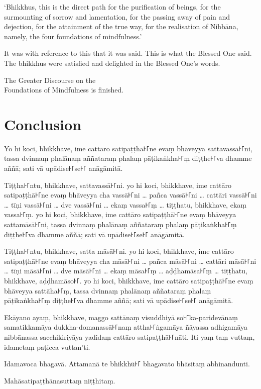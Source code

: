`Bhikkhus, this is the direct path for the purification of beings, for the
surmounting of sorrow and lamentation, for the passing away of pain and
dejection, for the attainment of the true way, for the realisation of Nibbāna,
namely, the four foundations of mindfulness.'

It was with reference to this that it was said. This is what the Blessed One
said. The bhikkhus were satisfied and delighted in the Blessed One's words.

\bigskip

{\centering\instructionFont\color{instruction}\upshape

  The Greater Discourse on the\\
  Foundations of Mindfulness is finished.

}

\paliPage
\chapter*{Conclusion}

Yo hi koci, bhikkhave, ime cattāro satipaṭṭhā꜔꜒ne evaṃ bhāveyya sattavassā꜔꜒ni,
tassa dvinnaṃ phalānaṃ aññataraṃ phalaṃ pāṭikaṅkha꜔꜒ṃ diṭṭhe꜔꜒va dhamme aññā; sati
vā upādise꜔꜒se꜔꜒ anāgāmitā.

Tiṭṭha꜔꜒ntu, bhikkhave, sattavassā꜔꜒ni. yo hi koci, bhikkhave, ime cattāro
satipaṭṭhā꜔꜒ne evaṃ bhāveyya cha vassā꜔꜒ni \ldots{} pañca vassā꜔꜒ni
\ldots{} cattāri vassā꜔꜒ni \ldots{} tīṇi vassā꜔꜒ni \ldots{} dve vassā꜔꜒ni \ldots{}
ekaṃ vassa꜔꜒ṃ \ldots{} tiṭṭhatu, bhikkhave, ekaṃ vassa꜔꜒ṃ. yo hi koci, bhikkhave,
ime cattāro satipaṭṭhā꜔꜒ne evaṃ bhāveyya sattamāsā꜔꜒ni, tassa dvinnaṃ phalānaṃ
aññataraṃ phalaṃ pāṭikaṅkha꜔꜒ṃ diṭṭhe꜔꜒va dhamme aññā; sati vā upādise꜔꜒se꜔꜒ anāgāmitā.

Tiṭṭha꜔꜒ntu, bhikkhave, satta māsā꜔꜒ni. yo hi koci, bhikkhave, ime cattāro
satipaṭṭhā꜔꜒ne evaṃ bhāveyya cha māsā꜔꜒ni \ldots{} pañca māsā꜔꜒ni \ldots{}
cattāri māsā꜔꜒ni \ldots{} tīṇi māsā꜔꜒ni \ldots{} dve māsā꜔꜒ni \ldots{} ekaṃ māsa꜔꜒ṃ
\ldots{} aḍḍhamāsa꜔꜒ṃ \ldots{} tiṭṭhatu, bhikkhave, aḍḍhamāso꜔꜒. yo hi koci,
bhikkhave, ime cattāro satipaṭṭhā꜔꜒ne evaṃ bhāveyya sattāha꜔꜒ṃ, tassa dvinnaṃ
phalānaṃ aññataraṃ phalaṃ pāṭikaṅkha꜔꜒ṃ diṭṭhe꜔꜒va dhamme aññā; sati vā upādise꜔꜒se꜔꜒
anāgāmitā.

Ekāyano ayaṃ, bhikkhave, maggo sattānaṃ visuddhiyā so꜔꜒ka-paridevānaṃ samatikkamāya
dukkha-domanassā꜔꜒naṃ attha꜔꜒ṅgamāya ñāyassa adhigamāya nibbānassa sacchikiriyāya
yadidaṃ cattāro satipaṭṭhā꜔꜒nāti. Iti yaṃ taṃ vuttaṃ, idametaṃ paṭicca vuttan'ti.

Idamavoca bhagavā. Attamanā te bhikkhū꜔꜒ bhagavato bhāsitaṃ abhinandunti.

\bigskip

{\centering\instructionFont\color{instruction}\upshape

  Mahāsatipaṭṭhānasuttaṃ niṭṭhitaṃ.

}

\resumeNormalText
